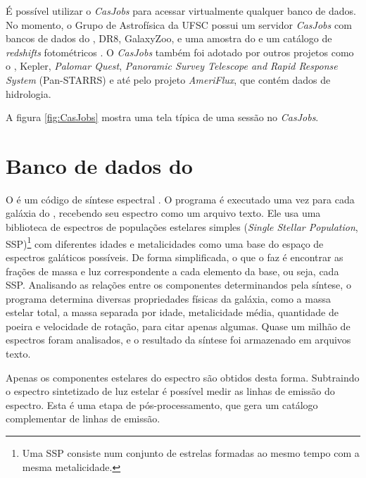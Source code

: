 É possível utilizar o {\em CasJobs} para acessar virtualmente qualquer banco de
dados. No momento, o Grupo de Astrofísica da UFSC possui um servidor {\em
CasJobs} com bancos de dados do \starlight, \SDSS DR8, GalaxyZoo\citneed, e uma
amostra do \galex e um catálogo de {\em redshifts} fotométricos
\citep{OMill2011}. O {\em CasJobs} também foi adotado por outros projetos como o
\galex, Kepler\citneed, {\em Palomar Quest}\citneed, {\em Panoramic Survey
Telescope and Rapid Response System} (Pan-STARRS) e até pelo projeto {\em
AmeriFlux}, que contém dados de hidrologia\citneed.

A figura \ref{fig:CasJobs} mostra uma tela típica de uma sessão no {\em
CasJobs}.



\section{Banco de dados do \STARLIGHT}

O \starlight é um código de síntese espectral \citep{CidFernandes2005}. O
programa é executado uma vez para cada galáxia do \SDSS, recebendo seu espectro
como um arquivo texto. Ele usa uma biblioteca de espectros de populações
estelares simples ({\em Single Stellar Population}, SSP)\footnote{Uma SSP
consiste num conjunto de estrelas formadas ao mesmo tempo com a mesma
metalicidade.} com diferentes idades e metalicidades como uma base do
espaço de espectros galáticos possíveis. De forma simplificada, o que o
\starlight faz é encontrar as frações de massa e luz correspondente a cada
elemento da base, ou seja, cada SSP. Analisando as relações entre os componentes
determinandos pela síntese, o programa determina diversas propriedades físicas
da galáxia, como a massa estelar total, a massa separada por idade, metalicidade
média, quantidade de poeira e velocidade de rotação, para citar apenas algumas.
Quase um milhão de espectros foram analisados, e o resultado da síntese foi
armazenado em arquivos texto.

Apenas os componentes estelares do espectro são obtidos desta forma. Subtraindo
o espectro sintetizado de luz estelar é possível medir as linhas de emissão do
espectro. Esta é uma etapa de pós-processamento, que gera um catálogo
complementar de linhas de emissão.

